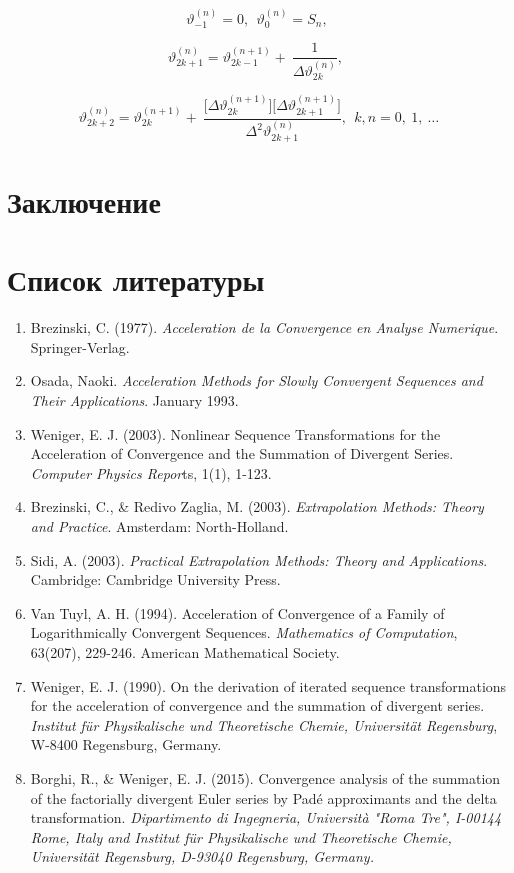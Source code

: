 \documentclass[14pt, a4paper]{extarticle}
\theoremstyle{definition}
\theoremstyle{remark}
\begin{document}
\[\vartheta_{- 1}^{(n)} = 0,\ \ \vartheta_{0}^{(n)} = S_{n},\ \]

\[\vartheta_{2k + 1}^{(n)} = \vartheta_{2k - 1}^{(n + 1)} + \ \frac{1}{\Delta\vartheta_{2k}^{(n)}},\ \ \]

\[\vartheta_{2k + 2}^{(n)} = \vartheta_{2k}^{(n + 1)} + \ \frac{\lbrack\Delta\vartheta_{2k}^{(n + 1)}\rbrack\lbrack\Delta\vartheta_{2k + 1}^{(n + 1)}\rbrack}{\Delta^{2}\vartheta_{2k + 1}^{(n)}},\ \ k,n = 0,\ 1,\ \ldots\]

\section{Заключение}

\section{Список
литературы}

\begin{enumerate}
\def\labelenumi{\arabic{enumi}.}
\item
  Brezinski, C. (1977). \emph{Acceleration de la Convergence en Analyse
  Numerique}. Springer-Verlag.
\item
  Osada, Naoki. \emph{Acceleration Methods for Slowly Convergent
  Sequences and Their Applications}. January 1993.
\item
  Weniger, E. J. (2003). Nonlinear Sequence Transformations for the
  Acceleration of Convergence and the Summation of Divergent Series.
  \emph{Computer Physics Repor}ts, 1(1), 1-123.
\item
  Brezinski, C., \& Redivo Zaglia, M. (2003). \emph{Extrapolation
  Methods: Theory and Practice}. Amsterdam: North-Holland.
\item
  Sidi, A. (2003). \emph{Practical Extrapolation Methods: Theory and
  Applications}. Cambridge: Cambridge University Press.
\item
  Van Tuyl, A. H. (1994). Acceleration of Convergence of a Family of
  Logarithmically Convergent Sequences. \emph{Mathematics of
  Computation}, 63(207), 229-246. American Mathematical Society.
\item
  Weniger, E. J. (1990). On the derivation of iterated sequence
  transformations for the acceleration of convergence and the summation
  of divergent series. \emph{Institut für Physikalische und Theoretische
  Chemie, Universität Regensburg}, W-8400 Regensburg, Germany.
\item
  Borghi, R., \& Weniger, E. J. (2015). Convergence analysis of the
  summation of the factorially divergent Euler series by Padé
  approximants and the delta transformation. \emph{Dipartimento di
  Ingegneria, Università "Roma Tre", I-00144 Rome, Italy and Institut
  für Physikalische und Theoretische Chemie, Universität Regensburg,
  D-93040 Regensburg, Germany.}
\end{enumerate}
\end{document}
